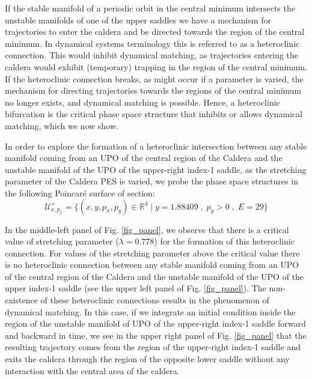 \documentclass[a4paper,10pt]{article}
\begin{document}
If the stable manifold of a periodic orbit in the central minimum intersects the unstable manifolds of one of the  upper  saddles we have a mechanism for trajectories to enter the caldera and be directed towards the region of the central minimum. In dynamical systems terminology this is referred to as a heteroclinic connection. This would inhibit dynamical matching, as trajectories entering the caldera would exhibit (temporary) trapping in the region of the central minimum. If the heteroclinic connection breaks, as might occur if a parameter is varied, the mechanism for directing trajectories towards the regions of the central minimum no longer exists, and dynamical matching is possible.  Hence, a heteroclinic bifurcation is the critical phase space structure that inhibits or allows dynamical matching, which we now show.

In order to explore the formation of a heteroclinic intersection between any stable manifold coming from an UPO of the central region of the Caldera and the unstable manifold of the UPO of the upper-right index-1 saddle, as the stretching parameter of the Caldera PES is varied, we probe the phase space structures in the following Poincar\'e surface of section:
\begin{equation}
\mathcal{U}^{+}_{x,p_x} = \lbrace (x,y,p_x,p_y) \in \mathbb{R}^4 \;|\; y = 1.88409 \; ,\; p_y > 0 \;,\; E = 29 \rbrace
\label{psos}
\end{equation}

In the middle-left panel of Fig. \ref{fig_panel}, we observe that there is a critical value of stretching parameter ($\lambda=0.778$) for the formation of this heteroclinic connection. For values of the stretching parameter above the critical value there is no  heteroclinic connection between any stable manifold coming from an UPO of the central region of the Caldera and the unstable manifold of the UPO of the upper index-1 saddle (see the upper left   panel of Fig. \ref{fig_panel}). The non-existence of these  heteroclinic connections results in the phenomenon of dynamical matching. In this case, if we integrate an initial condition inside the region of the unstable manifold of UPO of the upper-right index-1 saddle forward and backward in time, we see in the upper right panel of  Fig. \ref{fig_panel} that the resulting trajectory comes from the region of the upper-right index-1 saddle and exits the caldera through the region of the opposite lower saddle without any interaction with the central area of the caldera.
\end{document}
